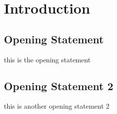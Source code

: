 \chapter{Introduction}

\section{Opening Statement}
this is the opening statement

\section{Opening Statement 2}
this is another opening statement 2

